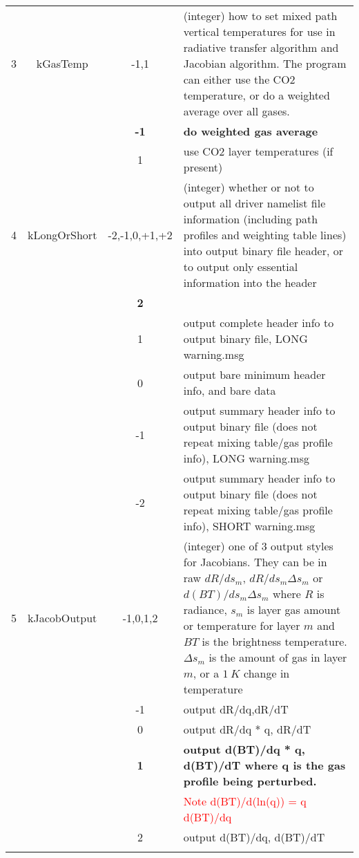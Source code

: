 \documentclass[12pt]{article}
\newlength{\colwidth}
\newlength{\colwidthshort}
\begin{document}
\begin{small}
\begin{longtable}{|c|c|c|p{\colwidthshort}|}
3  & {\sf kGasTemp} & -1,1       & (integer) how to set mixed path vertical 
temperatures for use in radiative transfer algorithm and Jacobian algorithm. 
The program can either use the CO2 temperature, or do a weighted average 
over all gases.\\
   &        & {\bf -1}    & {\bf do weighted gas average}\\
   &        & 1           &  use CO2 layer temperatures (if present)\\\hline

4  & {\sf kLongOrShort} &-2,-1,0,+1,+2    & (integer) whether or not to output all 
driver namelist file information (including path profiles and weighting table 
lines) into output binary file header, or to output only essential 
information into the header \\
   &  & {\bf 2}   & {\bf output complete header info to output binary file, SHORT warning.msg \\
   &  & 1        & output complete header info to output binary file, LONG warning.msg \\
   &  & 0        & output bare minimum header info, and bare data\\
   &  & -1       & output summary header info to output binary file
                    (does not repeat mixing table/gas profile info), LONG warning.msg\\
   &  & -2       & output summary header info to output binary file
                    (does not repeat mixing table/gas profile info), SHORT warning.msg\\  \hline
5 & {\sf kJacobOutput} & -1,0,1,2 & (integer) one of 3 output styles for 
    Jacobians.  They can be in raw $dR/ds_{m}$, $dR/ds_{m} \Delta s_{m}$ or 
    $d(BT)/ds_{m} \Delta s_{m}$ where $R$ is radiance, $s_{m}$ is layer gas 
    amount or temperature for layer $m$ and $BT$ is the brightness 
    temperature.  $\Delta s_{m}$ is the amount of gas in layer $m$, or a 
    $1~K$ change in temperature \\
  &      & -1        & output dR/dq,dR/dT\\
  &      & 0         & output dR/dq * q, dR/dT\\
  &      & {\bf 1}   & {\bf output d(BT)/dq * q, d(BT)/dT
                       where q is the gas profile being perturbed.}\\ 
  &      &           & \textcolor{red}{Note d(BT)/d(ln(q)) = q d(BT)/dq} \\
  &      & 2         & output d(BT)/dq, d(BT)/dT \\
}
\end{longtable}
\end{small}
\end{document}

